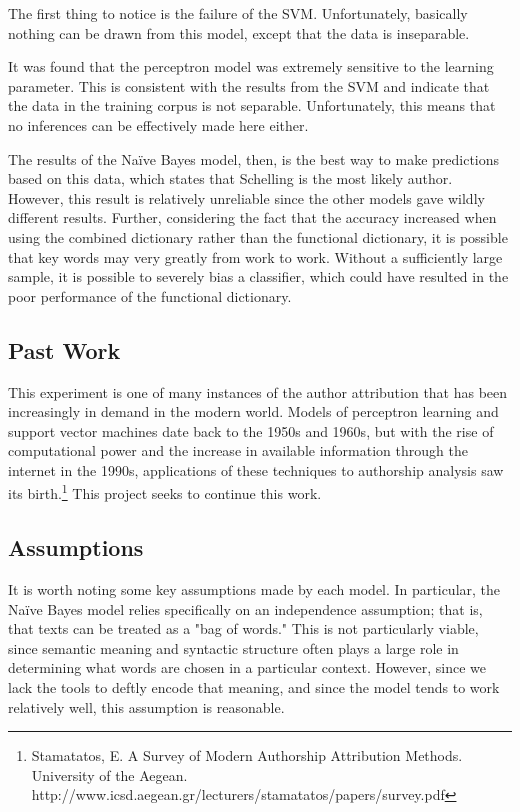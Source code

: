 \documentclass[11pt,letterpaper]{article}
\begin{document}
The first thing to notice is the failure of the SVM. Unfortunately, basically nothing can be drawn from this model, except that the data is inseparable.

It was found that the perceptron model was extremely sensitive to the learning parameter. This is consistent with the results from the SVM and indicate that the data in the training corpus is not separable. Unfortunately, this means that no inferences can be effectively made here either.

The results of the Na{\"i}ve Bayes model, then, is the best way to make predictions based on this data, which states that Schelling is the most likely author. However, this result is relatively unreliable since the other models gave wildly different results. Further, considering the fact that the accuracy increased when using the combined dictionary rather than the functional dictionary, it is possible that key words may very greatly from work to work. Without a sufficiently large sample, it is possible to severely bias a classifier, which could have resulted in the poor performance of the functional dictionary.

\subsection{Past Work}

This experiment is one of many instances of the author attribution that has been increasingly in demand in the modern world. Models of perceptron learning and support vector machines date back to the 1950s and 1960s, but with the rise of computational power and the increase in available information through the internet in the 1990s, applications of these techniques to authorship analysis saw its birth.\footnote{Stamatatos, E. A Survey of Modern Authorship Attribution Methods. University of the Aegean. http://www.icsd.aegean.gr/lecturers/stamatatos/papers/survey.pdf} This project seeks to continue this work.

\subsection{Assumptions}

It is worth noting some key assumptions made by each model. In particular, the Na{\"i}ve Bayes model relies specifically on an independence assumption; that is, that texts can be treated as a "bag of words." This is not particularly viable, since semantic meaning and syntactic structure often plays a large role in determining what words are chosen in a particular context. However, since we lack the tools to deftly encode that meaning, and since the model tends to work relatively well, this assumption is reasonable.
\end{document}
